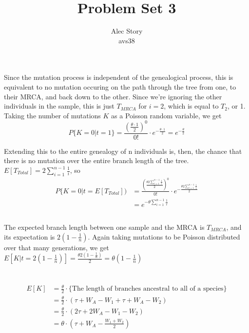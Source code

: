 \documentclass{article}
\title{Problem Set 3}
\author{Alec Story \\ \small{avs38}}
\begin{document}
\maketitle

\section{}
\subsection{}
Since the mutation process is independent of the genealogical process, this is
equivalent to no mutation occuring on the path through the tree from one, to
their MRCA, and back down to the other.  Since we're ignoring the other
individuals in the sample, this is just $T_{MRCA}$ for $i=2$, which is equal to
$T_2$, or 1.  Taking the number of mutations $K$ as a Poisson random variable, we
get $$P\{K=0 | t=1\} = \frac{(\frac{\theta \cdot 1}{2})^0}{0!} \cdot
                      e^{-\frac{\theta \cdot 1}{2}}
                    = e ^{-\frac{\theta}{2}}$$

Extending this to the entire genealogy of n individuals is, then, the chance
that there is no mutation over the entire branch length of the tree.
$E[T_{Total}] = 2 \sum_{i=1}^{n-1} \frac{1}{i}$, so
\begin{align*}
 P\{K=0 | t = E[T_{Total}]) &= \frac{(\frac{
                               \theta 2 \sum_{i=1}^{n-1} \frac{1}{i}}{2})^0}{0!}
                               \cdot
                               e^{-\frac{
                               \theta 2 \sum_{i=1}^{n-1} \frac{1}{i}}{2}} \\
                            &= e^{-\theta \sum_{i=1}^{n-1} \frac{1}{i}}
\end{align*}
\subsection{}
The expected branch length between one sample and the MRCA is $T_{MRCA}$, and
its expectation is $2(1-\frac{1}{n})$.  Again taking mutations to be Poisson
distributed over that many generations, we get $E[K|t=2(1-\frac{1}{n})] =
\frac{\theta 2(1-\frac{1}{n})}{2} = \theta (1-\frac{1}{n})$
\section{}
\section{}
\begin{align*}
E[K] &= \frac{\theta}{2} \cdot \{\textrm{The length of branches ancestral to
                                          all of a species}\} \\
     &= \frac{\theta}{2} \cdot (\tau + W_A - W_1 + \tau + W_A - W_2) \\
     &= \frac{\theta}{2} \cdot (2 \tau + 2 W_A - W_1 - W_2) \\
     &= \theta \cdot (\tau + W_A - \frac{W_1 + W_2}{2})
\end{align*}
\end{document}

